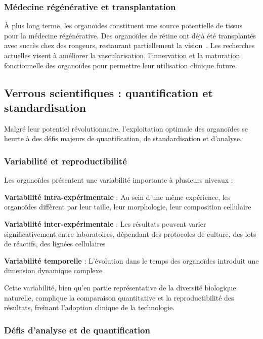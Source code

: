 \subsubsection{Médecine régénérative et transplantation}

À plus long terme, les organoïdes constituent une source potentielle de tissus pour la médecine régénérative. Des organoïdes de rétine ont déjà été transplantés avec succès chez des rongeurs, restaurant partiellement la vision~\cite{Lin2020}. Les recherches actuelles visent à améliorer la vascularisation, l'innervation et la maturation fonctionnelle des organoïdes pour permettre leur utilisation clinique future.

\subsection{Verrous scientifiques : quantification et standardisation}

Malgré leur potentiel révolutionnaire, l'exploitation optimale des organoïdes se heurte à des défis majeurs de quantification, de standardisation et d'analyse.

\subsubsection{Variabilité et reproductibilité}

Les organoïdes présentent une variabilité importante à plusieurs niveaux :

\textbf{Variabilité intra-expérimentale} : Au sein d'une même expérience, les organoïdes diffèrent par leur taille, leur morphologie, leur composition cellulaire

\textbf{Variabilité inter-expérimentale} : Les résultats peuvent varier significativement entre laboratoires, dépendant des protocoles de culture, des lots de réactifs, des lignées cellulaires

\textbf{Variabilité temporelle} : L'évolution dans le temps des organoïdes introduit une dimension dynamique complexe


Cette variabilité, bien qu'en partie représentative de la diversité biologique naturelle, complique la comparaison quantitative et la reproductibilité des résultats, freînant l'adoption clinique de la technologie.

\subsubsection{Défis d'analyse et de quantification}

